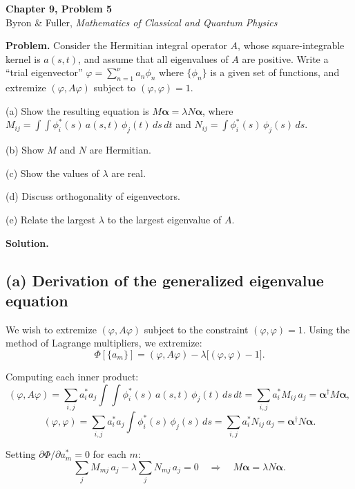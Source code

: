 \documentclass[12pt]{article}
\begin{document}
\begin{center}
{\Large\bfseries Chapter 9, Problem 5}\\[6pt]
Byron \& Fuller, \textit{Mathematics of Classical and Quantum Physics}
\end{center}

\bigskip

\textbf{Problem.} Consider the Hermitian integral operator $A$, whose square-integrable kernel is $a(s,t)$, and assume that all eigenvalues of $A$ are positive. Write a ``trial eigenvector'' $\varphi = \sum_{n=1}^{\nu} a_n \phi_n$ where $\{\phi_n\}$ is a given set of functions, and extremize $(\varphi, A\varphi)$ subject to $(\varphi, \varphi) = 1$.

(a) Show the resulting equation is $M\boldsymbol{\alpha} = \lambda N\boldsymbol{\alpha}$, where $M_{ij} = \int\!\!\int \phi_i^*(s)\,a(s,t)\,\phi_j(t)\,ds\,dt$ and $N_{ij} = \int \phi_i^*(s)\,\phi_j(s)\,ds$.

(b) Show $M$ and $N$ are Hermitian.

(c) Show the values of $\lambda$ are real.

(d) Discuss orthogonality of eigenvectors.

(e) Relate the largest $\lambda$ to the largest eigenvalue of $A$.

\bigskip
\textbf{Solution.}

\subsection*{(a) Derivation of the generalized eigenvalue equation}

We wish to extremize $(\varphi, A\varphi)$ subject to the constraint $(\varphi, \varphi) = 1$. Using the method of Lagrange multipliers, we extremize:
\[
\Phi[\{a_m\}] = (\varphi, A\varphi) - \lambda\bigl[(\varphi, \varphi) - 1\bigr].
\]

Computing each inner product:
\[
(\varphi, A\varphi) = \sum_{i,j} a_i^* a_j \int\!\!\int \phi_i^*(s)\,a(s,t)\,\phi_j(t)\,ds\,dt = \sum_{i,j} a_i^* M_{ij}\,a_j = \boldsymbol{\alpha}^\dagger M \boldsymbol{\alpha},
\]
\[
(\varphi, \varphi) = \sum_{i,j} a_i^* a_j \int \phi_i^*(s)\,\phi_j(s)\,ds = \sum_{i,j} a_i^* N_{ij}\,a_j = \boldsymbol{\alpha}^\dagger N \boldsymbol{\alpha}.
\]

Setting $\partial \Phi / \partial a_m^* = 0$ for each $m$:
\[
\sum_j M_{mj}\,a_j - \lambda \sum_j N_{mj}\,a_j = 0 \quad \Longrightarrow \quad \boxed{M\boldsymbol{\alpha} = \lambda N\boldsymbol{\alpha}}.
\]
\end{document}
